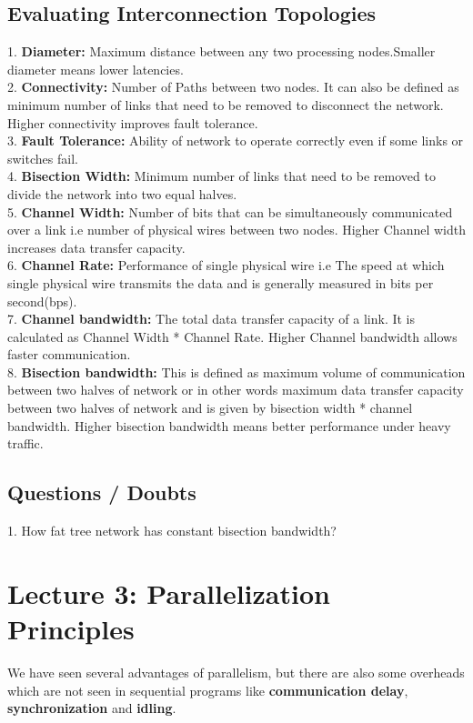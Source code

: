 \documentclass{article}
\begin{document}
\subsection*{Evaluating Interconnection Topologies}
1. \textbf{Diameter: } Maximum distance between any two processing nodes.Smaller diameter means lower latencies. \\
2. \textbf{Connectivity: } Number of Paths between two nodes. It can also be defined as minimum number of links that need to be removed to disconnect the network. Higher connectivity improves fault tolerance.\\
3. \textbf{Fault Tolerance: } Ability of network to operate correctly even if some links or switches fail. \\
4. \textbf{Bisection Width: } Minimum number of links that need to be removed to divide the network into two equal halves. \\
5. \textbf{Channel Width: } Number of bits that can be simultaneously communicated over a link i.e number of physical wires between two nodes. Higher Channel width increases data transfer capacity. \\
6. \textbf{Channel Rate: } Performance of single physical wire i.e The speed at which single physical wire transmits the data and is generally measured in bits per second(bps). \\
7. \textbf{Channel bandwidth: } The total data transfer capacity of a link. It is calculated as Channel Width * Channel Rate. Higher Channel bandwidth allows faster communication. \\
8. \textbf{Bisection bandwidth: } This is defined as maximum volume of communication between two halves of network or in other words maximum data transfer capacity between two halves of network and is given by bisection width * channel bandwidth. Higher bisection bandwidth means better performance under heavy traffic. \\

\subsection*{Questions / Doubts }
1. How fat tree network has constant bisection bandwidth? \\

\newpage

\section*{Lecture 3: Parallelization Principles}
We have seen several advantages of parallelism, but there are also some overheads which are not seen in sequential programs like \textbf{communication delay}, \textbf{synchronization} and \textbf{idling}.
\end{document}
